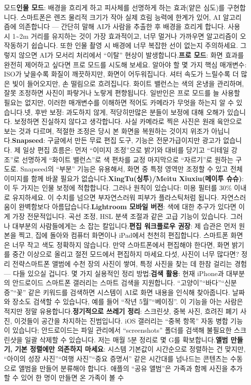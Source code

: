 모드\textbf{인물 모드}: 배경을 흐리게 하고 피사체를 선명하게 하는 효과(얕은 심도)를 구현합니다. 스마트폰은 렌즈 물리적 크기가 작아 실제 흐림 능력에 한계가 있어, AI 알고리즘에 의존합니다 — 간단히 말해 AI가 사람을 추출한 후 배경을 흐리게 합니다. 사용 시 1\textasciitilde{}2m 거리를 유지하는 것이 가장 효과적이고, 너무 멀거나 가까우면 알고리즘이 오작동하기 쉽습니다. 또한 인물 촬영 시 배경에 너무 복잡한 선이 없는지 주의하세요. 그렇지 않으면 AI가 모서리 처리에서 “이탈” 현상이 발생합니다.\textbf{프로 모드}: 화면 효과를 완전히 제어하고 싶다면 프로 모드를 시도해 보세요. 알아야 할 몇 가지 핵심 매개변수: ISO가 낮을수록 화질이 깨끗하지만, 화면이 어두워집니다. 셔터 속도가 느릴수록 더 많은 빛이 들어오지만, 손 떨림으로 흐려집니다. 화이트 밸런스는 색의 온냉을 관리하며, 잘못 조정하면 사진이 파랗거나 노랗게 편향됩니다. 일반인은 프로 모드를 늘 사용할 필요는 없지만, 이러한 매개변수를 이해하면 적어도 카메라가 무엇을 하는지 알 수 있습니다.넷, 후반 보정: 과도하지 않게, 적당히만많은 분들이 보정에 대해 오해가 있습니다. 보정하면 진실하지 않다고 생각합니다. 사실 카메라로 찍은 사진은 원래 육안으로 보는 것과 다르며, 적절한 조정은 당시 본 화면을 복원하는 것이지 위조가 아닙니다.\textbf{Snapseed}: 구글에서 만든 무료 편집 도구, 기능은 전문가급이지만 광고가 없습니다. 제 일상 편집 흐름은: 먼저 “이미지 조정”으로 밝기와 대비를 당기고 “디테일 강조”로 선명하게 “화이트 밸런스”로 색 편차를 교정 마지막으로 “자르기”로 원하는 구도로. Snapseed의 “부분” 기능은 유용해서, 화면 중 특정 영역만 조정할 수 있고 전체 이미지를 함께 바꿀 필요가 없습니다.\textbf{XingTu(싱투)/Meitu Xiuxiu(메이투 슈슈)}: 이 두 가지는 인물 보정에 적합합니다. 그러나 원칙이 있습니다: 미용 필터를 30\% 이내로 유지하세요. 이 수치를 넘으면 부자연스러워 피부가 플라스틱처럼 됩니다. 자연스러움이 완벽함보다 아름답습니다.\textbf{Lightroom 모바일 버전}: 색에 대한 추구가 있다면 이게 가장 전문적입니다. 곡선 조정, HSL 분색 조절과 같은 고급 기능이 있습니다. 그러나 대부분의 사람들에게는 소 잡는 칼입니다.\textbf{편집 워크플로우 권장}: 제 습관은 먼저 원본을 찍고, 집에 돌아와 컴퓨터 화면이나 iPad에서 천천히 편집합니다. 스마트폰 화면은 너무 작고 색도 정확하지 않습니다. 만약 스마트폰에서 편집해야 한다면, 화면 밝기를 중간 이상으로 올리고 절전 모드에서 편집하지 마세요.다섯, 사진이 너무 많다면? 정리 전략스마트폰 앨범에 수천 장의 사진이 쌓여, 특정 사진을 찾는 데 한참 걸리는 경험 — 다들 있으실 겁니다. 몇 가지 실용적인 정리 방법:\textbf{검색 활용}: 현재 iPhone과 대부분의 안드로이드 스마트폰 갤러리는 스마트 검색을 지원합니다. “고양이”“바다”“신분증”“꽃” 같은 키워드를 검색하면 시스템이 AI로 화면 내용을 인식해 찾아줍니다. 날짜와 장소도 검색할 수 있습니다, 예를 들어 “작년 5월”“베이징”. 이 기능을 아는 사람은 적지만 정말 유용합니다.\textbf{정기적으로 쓰레기 정리}: 스크린샷, 중복 사진, 흐려진 폐기 사진, 이것들이 공간을 차지하는 진범입니다. iOS 갤러리는 “중복 항목” 자동 병합 기능이 있습니다; 안드로이드는 파일 관리에서 “screenshots” 폴더를 검색해 불필요한 스크린샷을 일괄 삭제할 수 있습니다. 저는 매월 5분 정리로 몇 G를 확보합니다.\textbf{앨범 만들기, 기본 정렬에만 의존하지 마세요}: 시스템 기본값이 시간순으로 정렬하는 건 맞지만, “아이의 성장 사진”“여행 사진”“중요 증명서” 같은 시간대를 넘나드는 콘텐츠는 수동으로 앨범을 만들어 분류해야 합니다. 애플의 “공유 앨범”은 가족과 함께 사진을 추가할 수 있어 한 명이 만들면 온 가족이 볼 수 